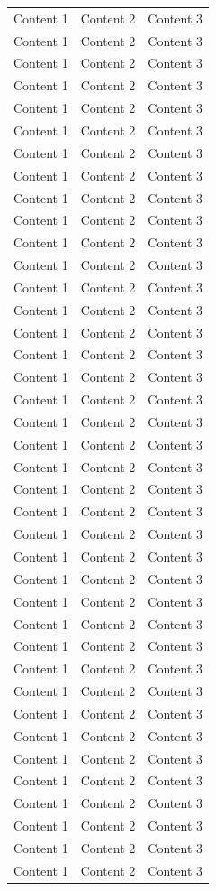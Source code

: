 \documentclass{article}
\begin{document}
\begin{longtable}{|*{3}{p{}|}}
  Content 1 & Content 2 & Content 3\\
  Content 1 & Content 2 & Content 3\\
  Content 1 & Content 2 & Content 3\\
  Content 1 & Content 2 & Content 3\\
  Content 1 & Content 2 & Content 3\\
  Content 1 & Content 2 & Content 3\\
  Content 1 & Content 2 & Content 3\\
  Content 1 & Content 2 & Content 3\\
  Content 1 & Content 2 & Content 3\\
  Content 1 & Content 2 & Content 3\\
  Content 1 & Content 2 & Content 3\\
  Content 1 & Content 2 & Content 3\\
  Content 1 & Content 2 & Content 3\\
  Content 1 & Content 2 & Content 3\\
  Content 1 & Content 2 & Content 3\\
  Content 1 & Content 2 & Content 3\\
  Content 1 & Content 2 & Content 3\\
  Content 1 & Content 2 & Content 3\\
  Content 1 & Content 2 & Content 3\\
  Content 1 & Content 2 & Content 3\\
  Content 1 & Content 2 & Content 3\\
  Content 1 & Content 2 & Content 3\\
  Content 1 & Content 2 & Content 3\\
  Content 1 & Content 2 & Content 3\\
  Content 1 & Content 2 & Content 3\\
  Content 1 & Content 2 & Content 3\\
  Content 1 & Content 2 & Content 3\\
  Content 1 & Content 2 & Content 3\\
  Content 1 & Content 2 & Content 3\\
  Content 1 & Content 2 & Content 3\\
  Content 1 & Content 2 & Content 3\\
  Content 1 & Content 2 & Content 3\\
  Content 1 & Content 2 & Content 3\\
  Content 1 & Content 2 & Content 3\\
  Content 1 & Content 2 & Content 3\\
  Content 1 & Content 2 & Content 3\\
  Content 1 & Content 2 & Content 3\\
  Content 1 & Content 2 & Content 3\\
  Content 1 & Content 2 & Content 3\\
\end{longtable}
\end{document}
